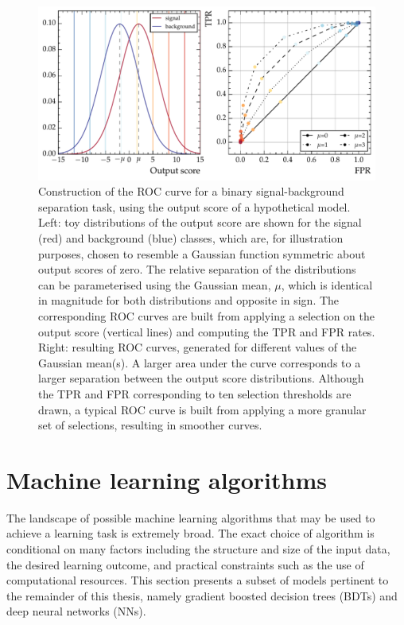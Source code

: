 \begin{figure}[htbp!]
\centering
\includegraphics[width =0.95\linewidth]{Figures/ML/ROC_example.pdf}\hfill%
\caption[The construction of an ROC curve from the output score of a binary classifier.]{Construction of the ROC curve for a binary signal-background separation task, using the output score of a hypothetical model. Left: toy distributions of the output score are shown for the signal (red) and background (blue) classes, which are, for illustration purposes, chosen to resemble a Gaussian function symmetric about output scores of zero. The relative separation of the distributions can be parameterised using the Gaussian mean, $\mu$, which is identical in magnitude for both distributions and opposite in sign. The corresponding ROC curves are built from applying a selection on the output score (vertical lines) and computing the TPR and FPR rates. Right: resulting ROC curves, generated for different values of the Gaussian mean(s). A larger area under the curve corresponds to a larger separation between the output score distributions. Although the TPR and FPR corresponding to ten selection thresholds are drawn, a typical ROC curve is built from applying a more granular set of selections, resulting in smoother curves.}
\label{fig:ML_ROC_example}
\end{figure}



\section{Machine learning algorithms}

The landscape of possible machine learning algorithms that may be used to achieve a learning task is extremely broad.
The exact choice of algorithm is conditional on many factors including the structure and size of the input data, the desired learning outcome, and practical constraints such as the use of computational resources.
This section presents a subset of models pertinent to the remainder of this thesis, namely gradient boosted decision trees (BDTs) and deep neural networks (NNs). 

